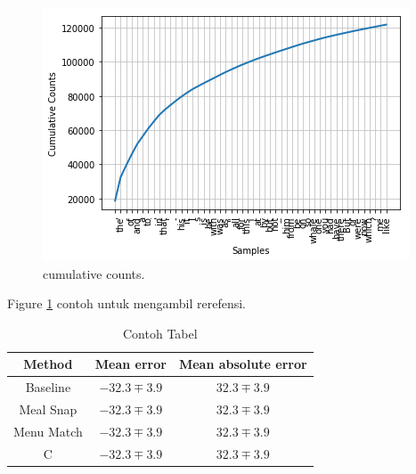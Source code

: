 \documentclass{article}
\begin{document}
\begin{figure}
  \includegraphics[width=\linewidth]{output_55_0.png}
  \caption{cumulative counts.}
  \label{fig:cumulative counts}
\end{figure}

Figure \ref{fig:cumulative counts} contoh untuk mengambil rerefensi.

\begin{table}[h!]
\center
\begin{center}
 \begin{tabular}{||c c c||} 
 \hline
 Method & Mean error & Mean absolute error \\ [1ex]
 \hline\hline
 Baseline & $-32.3\mp3.9$ & $32.3\mp3.9$ \\  
 Meal Snap & $-32.3\mp3.9$ & $32.3\mp3.9$ \\
 Menu Match & $-32.3\mp3.9$ & $32.3\mp3.9$ \\
 C & $-32.3\mp3.9$ & $32.3\mp3.9$ \\
 \hline
\end{tabular}
\end{center}
\caption{Contoh Tabel}
\label{table:1}
\end{table}
\end{document}
